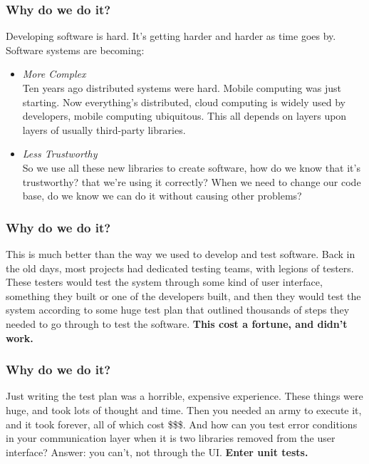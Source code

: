 \documentclass[t, 10pt]{beamer}
\begin{document}
\begin{frame}
\frametitle{Why do we do it?}
Developing software is hard.  It's getting harder and harder as time goes by.  Software systems are becoming:
\begin{itemize}
\item \textit{More Complex} \\
Ten years ago distributed systems were hard.  Mobile computing was just starting.  Now everything's distributed, cloud computing is widely used by developers, mobile computing ubiquitous.  This all depends on layers upon layers of usually third-party libraries.
\item \textit{Less Trustworthy} \\
So we use all these new libraries to create software, how do we know that it's trustworthy? that we're using it correctly? When we need to change our code base, do we know we can do it without causing other problems?
\end{itemize}

\end{frame}

\begin{frame}
\frametitle{Why do we do it?}
This is much better than the way we used to develop and test software.
\newline
\newline
\newline
Back in the old days, most projects had dedicated testing teams, with legions of testers.  These testers would test the system through some kind of user interface, something they built or one of the developers built, and then they would test the system according to some huge test plan that outlined thousands of steps they needed to go through to test the software.
\newline
\newline
\newline
\textbf{This cost a fortune, and didn't work.}
\end{frame}

\begin{frame}
\frametitle{Why do we do it?}
Just writing the test plan was a horrible, expensive experience.  These things were huge, and took lots of thought and time.  Then you needed an army to execute it, and it took forever, all of which cost \$\$\$.  And how can you test error conditions in your communication layer when it is two libraries removed from the user interface?
\newline
\newline
\newline
Answer: you can't, not through the UI.
\newline
\newline
\newline
\textbf{Enter unit tests.}
\end{frame}
\end{document}
